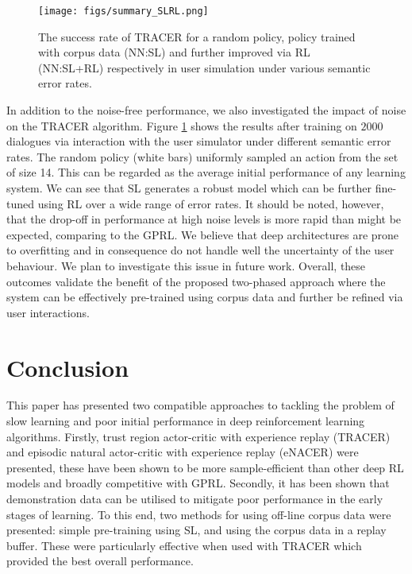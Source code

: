 \documentclass[11pt,a4paper]{article}
\begin{document}
\begin{figure}[t]
\centerline{\texttt{[image: figs/summary\_SLRL.png]}}
\caption{The success rate of TRACER for a random policy, policy trained with corpus data (NN:SL) and further improved via RL (NN:SL+RL) respectively in user simulation under various semantic error rates.} 
\label{fig:bar1}
\vspace{-5mm}
\end{figure}

In addition to the noise-free performance, we also investigated the impact of noise on the TRACER algorithm. 
Figure \ref{fig:bar1} shows the results after training on $2000$  dialogues via interaction with the user simulator under different semantic error rates.
The random policy (white bars) uniformly sampled an action from the set of size 14. 
This can be regarded as the average initial performance of any learning system.
We can see that SL generates a robust model which can be further fine-tuned using RL over a wide range of error rates. It should be noted, however, that the drop-off in performance at high noise levels is more rapid than might be expected, comparing to the GPRL. We believe that deep architectures are prone to overfitting and in consequence do not handle well the uncertainty of the user behaviour. We plan to investigate this issue in future work.
Overall, these outcomes validate the benefit of the proposed two-phased approach where the system can be effectively pre-trained using corpus data and further be refined via user interactions.

\section{Conclusion} \label{sec:conclude}
This paper has presented two compatible approaches to tackling the problem of slow learning and poor initial performance in deep reinforcement learning algorithms. Firstly, trust region actor-critic with experience replay (TRACER) and episodic natural actor-critic with experience replay (eNACER) were presented, these have been shown to be more sample-efficient than other deep RL models and broadly competitive with GPRL. Secondly, it has been shown that demonstration data can be utilised
to mitigate poor performance in the early stages of learning. To this end, 
two methods for using off-line corpus data were presented: simple pre-training using SL, and using the corpus data in a replay buffer.  These were particularly effective when used with TRACER which provided the best overall performance. 
\end{document}
